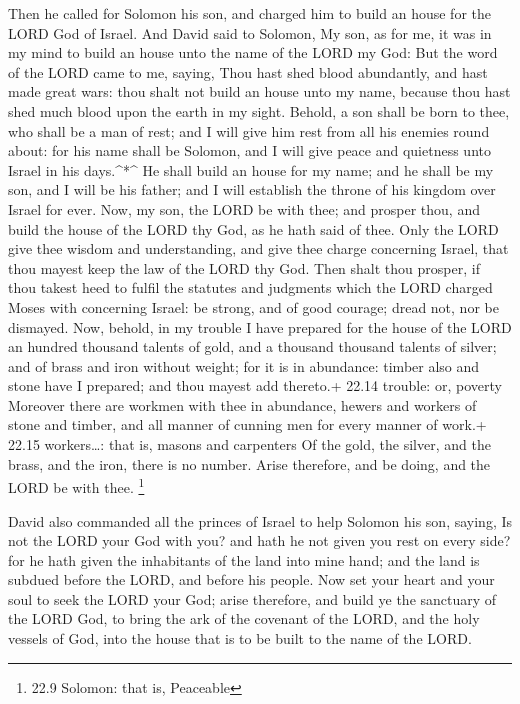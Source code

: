  Then he called for Solomon his son, and charged him to
build an house for the LORD God of Israel.  And David said
to Solomon, My son, as for me, it was in my mind to build an house unto
the name of the LORD my God:  But the word of the LORD came
to me, saying, Thou hast shed blood abundantly, and hast made great
wars: thou shalt not build an house unto my name, because thou hast shed
much blood upon the earth in my sight.  Behold, a son shall
be born to thee, who shall be a man of rest; and I will give him rest
from all his enemies round about: for his name shall be Solomon, and I
will give peace and quietness unto Israel in his days.\^{}*\^{}
 He shall build an house for my name; and he shall be my
son, and I will be his father; and I will establish the throne of his
kingdom over Israel for ever.  Now, my son, the LORD be
with thee; and prosper thou, and build the house of the LORD thy God, as
he hath said of thee.  Only the LORD give thee wisdom and
understanding, and give thee charge concerning Israel, that thou mayest
keep the law of the LORD thy God.  Then shalt thou prosper,
if thou takest heed to fulfil the statutes and judgments which the LORD
charged Moses with concerning Israel: be strong, and of good courage;
dread not, nor be dismayed.  Now, behold, in my trouble I
have prepared for the house of the LORD an hundred thousand talents of
gold, and a thousand thousand talents of silver; and of brass and iron
without weight; for it is in abundance: timber also and stone have I
prepared; and thou mayest add thereto.+ 22.14 trouble: or, poverty
 Moreover there are workmen with thee in abundance, hewers
and workers of stone and timber, and all manner of cunning men for every
manner of work.+ 22.15 workers\ldots: that is, masons and carpenters
 Of the gold, the silver, and the brass, and the iron,
there is no number. Arise therefore, and be doing, and the LORD be with
thee. \footnote{22.9 Solomon: that is, Peaceable}

 David also commanded all the princes of Israel to help
Solomon his son, saying,  Is not the LORD your God with
you? and hath he not given you rest on every side? for he hath given the
inhabitants of the land into mine hand; and the land is subdued before
the LORD, and before his people.  Now set your heart and
your soul to seek the LORD your God; arise therefore, and build ye the
sanctuary of the LORD God, to bring the ark of the covenant of the LORD,
and the holy vessels of God, into the house that is to be built to the
name of the LORD.

